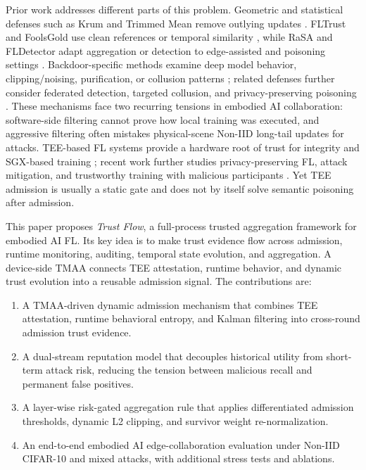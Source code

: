 \documentclass[runningheads,orivec]{llncs}
\newenvironment{tightenumerate}{%
    \begin{enumerate}\setlength{\itemsep}{1pt}\setlength{\parskip}{0pt}\setlength{\parsep}{0pt}}{\end{enumerate}}
\begin{document}
Prior work addresses different parts of this problem. Geometric and statistical defenses such as Krum and Trimmed Mean remove outlying updates \cite{blanchard2017krum,yin2018byzantine}. FLTrust and FoolsGold use clean references or temporal similarity \cite{cao2021fltrust,fung2020foolsgold}, while RaSA and FLDetector adapt aggregation or detection to edge-assisted and poisoning settings \cite{wang2025rasa,fldetector2022}. Backdoor-specific methods examine deep model behavior, clipping/noising, purification, or collusion patterns \cite{deepsight2022,flame2022,flpurifier}; related defenses further consider federated detection, targeted collusion, and privacy-preserving poisoning \cite{crowdguard2024,roseagg,shieldfl}. These mechanisms face two recurring tensions in embodied AI collaboration: software-side filtering cannot prove how local training was executed, and aggressive filtering often mistakes physical-scene Non-IID long-tail updates for attacks. TEE-based FL systems provide a hardware root of trust for integrity and SGX-based training \cite{r1_tee_integrity,xu2021distributed}; recent work further studies privacy-preserving FL, attack mitigation, and trustworthy training with malicious participants \cite{zhang2025rppfl,r5_tee_mitigating,lu2025tmt}. Yet TEE admission is usually a static gate and does not by itself solve semantic poisoning after admission.

This paper proposes \emph{Trust Flow}, a full-process trusted aggregation framework for embodied AI FL. Its key idea is to make trust evidence flow across admission, runtime monitoring, auditing, temporal state evolution, and aggregation. A device-side TMAA connects TEE attestation, runtime behavior, and dynamic trust evolution into a reusable admission signal. The contributions are:
\begin{tightenumerate}
    \item A TMAA-driven dynamic admission mechanism that combines TEE attestation, runtime behavioral entropy, and Kalman filtering into cross-round admission trust evidence.
    \item A dual-stream reputation model that decouples historical utility from short-term attack risk, reducing the tension between malicious recall and permanent false positives.
    \item A layer-wise risk-gated aggregation rule that applies differentiated admission thresholds, dynamic L2 clipping, and survivor weight re-normalization.
    \item An end-to-end embodied AI edge-collaboration evaluation under Non-IID CIFAR-10 and mixed attacks, with additional stress tests and ablations.
\end{tightenumerate}
\end{document}

